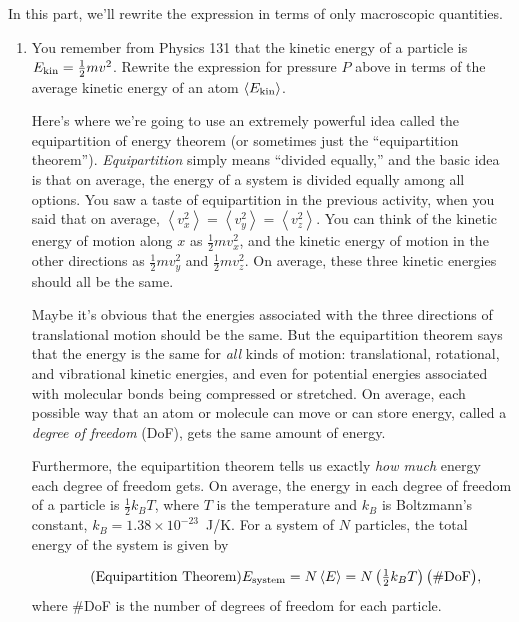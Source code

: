 In this part, we'll rewrite the expression in terms of only macroscopic quantities.  

\begin{enumerate}[labparts]

\item You remember from Physics 131 that the kinetic energy of a particle is $E_{\rm kin} = \frac{1}{2}mv^2$.  Rewrite the expression for pressure $P$ above in terms of the average kinetic energy of an atom $\left<  E_{\rm kin} \right>$.
\answerspace{0.6in}

Here's where we're going to use an extremely powerful idea called the equipartition of energy theorem (or sometimes just the ``equipartition theorem'').  \textit{Equipartition} simply means ``divided equally,'' and the basic idea is that on average, the energy of a system is divided equally among all options.
You saw a taste of equipartition in the previous activity, when you said that on average, $ \left< v_x^2 \right >= \left< v_y^2 \right > = \left< v_z^2 \right > $.  You can think of the kinetic energy of motion along $x$ as 
$\frac{1}{2}mv_x^2$, and the kinetic energy of motion in the other directions as $\frac{1}{2}mv_y^2$ and $\frac{1}{2}mv_z^2$.  On average, these three kinetic energies should all be the same.

Maybe it's obvious that the energies associated with the three directions of translational motion should be the same.  But the equipartition theorem says that the energy is the same for \textit{all} kinds of motion: translational, rotational, and vibrational kinetic energies, and even for potential energies associated with molecular bonds being compressed or stretched.  On average, each possible way that an atom or molecule can move or can store energy, called a \textit{degree of freedom} (DoF), gets the same amount of energy.

Furthermore, the equipartition theorem tells us exactly \textit{how much} energy each degree of freedom gets.  On average, the energy in each degree of freedom of a particle is $\frac{1}{2}k_BT$, where $T$ is the temperature and $k_B$ is Boltzmann's constant, $k_B=1.38 \times 10^{-23}$~J/K.  For a system of $N$ particles, the total energy of the system is given by

\begin{equation*}
\tag{Equipartition Theorem}
\textstyle 
E_\text{system}=N\left<  E \right> = N \left(\frac{1}{2}k_BT\right)\bigl({\rm \#DoF}\bigr),
\end{equation*}
where \#DoF is the number of degrees of freedom for each particle.


\end{enumerate}
